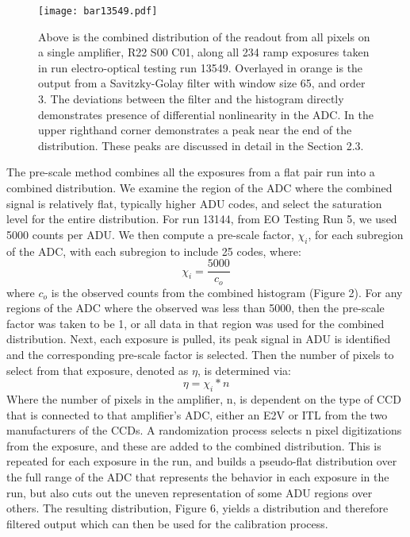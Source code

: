 \documentclass[11pt, letterpaper]{article}
\begin{document}
\begin{figure}
	\texttt{[image: bar13549.pdf]}
	\caption{Above is the combined distribution of the readout from all pixels on a single amplifier, R22 S00 C01, along all 234 ramp exposures taken in run electro-optical testing run 13549. Overlayed in orange is the output from a Savitzky-Golay filter with window size 65, and order 3. The deviations between the filter and the histogram directly 				demonstrates presence of differential nonlinearity in the ADC. In the upper righthand corner demonstrates a peak near the end of the distribution. These peaks are discussed in detail in the Section 2.3.}
\end{figure}
\indent


The pre-scale method combines all the exposures from a flat pair run into a combined distribution. 
We examine the region of the ADC where the combined signal is relatively flat, typically higher ADU codes, and select the saturation level for the entire distribution. 
For run 13144, from EO Testing Run 5, we used 5000 counts per ADU. 
 We then compute a pre-scale factor, $\chi _i$, for each subregion of the ADC, with each subregion to include 25 codes, where:
\begin{equation}\label{}
\chi_i = \frac{5000}{c_o}
\end{equation}
where $c_o$ is the observed counts from the combined histogram (Figure 2). 
For any regions of the ADC where the observed was less than 5000, then the pre-scale factor was taken to be 1, or all data in that region was used for the combined distribution. 
Next, each exposure is pulled, its peak signal in ADU is identified and the corresponding pre-scale factor is selected. 
Then the number of pixels to select from that exposure, denoted as $\eta $, is determined via: 
 \begin{equation}\label{}
 \eta = \chi_i *n 
\end{equation}
Where the number of pixels in the amplifier, n, is dependent on the type of CCD that is connected to that amplifier's ADC, either an E2V or ITL from the two manufacturers of the CCDs. 
A randomization process selects n pixel digitizations from the exposure, and these are added to the combined distribution. 
This is repeated for each exposure in the run, and builds a pseudo-flat distribution over the full range of the ADC that represents the behavior in each exposure in the run, but also cuts out the uneven representation of some ADU regions over others. 
The resulting distribution, Figure 6, yields a distribution and therefore filtered output which can then be used for the calibration process. 
\end{document}
